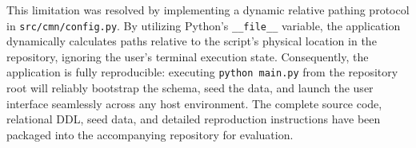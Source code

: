 \documentclass[10pt,twocolumn,letterpaper]{article}
\begin{document}
This limitation was resolved by implementing a dynamic relative pathing protocol in \texttt{src/cmn/config.py}. By utilizing Python's \texttt{\_\_file\_\_} variable, the application dynamically calculates paths relative to the script's physical location in the repository, ignoring the user's terminal execution state. Consequently, the application is fully reproducible: executing \texttt{python main.py} from the repository root will reliably bootstrap the schema, seed the data, and launch the user interface seamlessly across any host environment. The complete source code, relational DDL, seed data, and detailed reproduction instructions have been packaged into the accompanying repository for evaluation.
\end{document}
